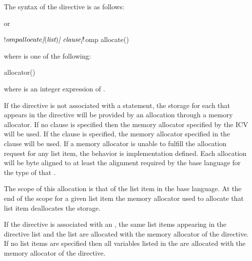 \begin{fortranspecific}
The syntax of the  directive is as follows:


or
\begin{ompfPragma}
!$omp allocate\plc{[}()\plc{] clause}
\plc{[}!$omp allocate() 
\plc{[...]]}
\end{ompfPragma}

where  is one of the following:

\begin{indentedcodelist}
allocator()
\end{indentedcodelist}

where  is an integer expression of  .

\end{fortranspecific}

\descr

If the directive is not associated with a statement, the storage for each 
 that appears in the directive will be provided by an allocation 
through a memory allocator. If no clause is specified then the memory allocator 
specified by the  ICV will be used. If the  
clause is specified, the memory allocator specified in the clause will be used. 
If a memory allocator is unable to fulfill the allocation request for any list 
item, the behavior is implementation defined. Each  allocation 
will be byte aligned to at least the alignment required by the
base language for the type of that .

The scope of this allocation is that of the list item in the base language. At 
the end of the scope for a given list item the memory allocator used to allocate 
that list item deallocates the storage.

\begin{fortranspecific}
If the directive is associated with an , the same list 
items appearing in the directive list and the  list are 
allocated with the memory allocator of the directive. If no list items are 
specified then all variables listed in the  are 
allocated with the memory allocator of the directive.
\end{fortranspecific}

